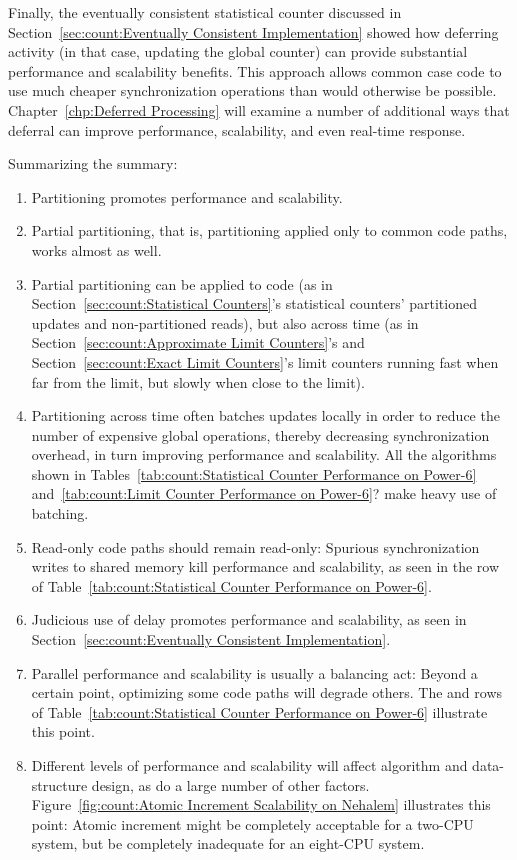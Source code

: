 Finally, the eventually consistent statistical counter discussed in
Section~\ref{sec:count:Eventually Consistent Implementation}
showed how deferring activity (in that case, updating the global
counter) can provide substantial performance and scalability benefits.
This approach allows common case code to use much cheaper synchronization
operations than would otherwise be possible.
Chapter~\ref{chp:Deferred Processing} will examine a number of additional
ways that deferral can improve performance, scalability, and even
real-time response.

Summarizing the summary:

\begin{enumerate}
\item	Partitioning promotes performance and scalability.
\item	Partial partitioning, that is, partitioning applied only to
	common code paths, works almost as well.
\item	Partial partitioning can be applied to code (as in
	Section~\ref{sec:count:Statistical Counters}'s statistical
	counters' partitioned updates and non-partitioned reads), but also
	across time (as in
	Section~\ref{sec:count:Approximate Limit Counters}'s and
	Section~\ref{sec:count:Exact Limit Counters}'s
	limit counters running fast when far from
	the limit, but slowly when close to the limit).
\item	Partitioning across time often batches updates locally
	in order to reduce the number of expensive global operations,
	thereby decreasing synchronization overhead, in turn
	improving performance and scalability.
	All the algorithms shown in
	Tables~\ref{tab:count:Statistical Counter Performance on Power-6}
	and~\ref{tab:count:Limit Counter Performance on Power-6}?
	make heavy use of batching.
\item	Read-only code paths should remain read-only:  Spurious
	synchronization writes to shared memory kill performance
	and scalability, as seen in the  row of
	Table~\ref{tab:count:Statistical Counter Performance on Power-6}.
\item	Judicious use of delay promotes performance and scalability, as
	seen in Section~\ref{sec:count:Eventually Consistent Implementation}.
\item	Parallel performance and scalability is usually a balancing act:
	Beyond a certain point, optimizing some code paths will degrade
	others.
	The  and  rows of
	Table~\ref{tab:count:Statistical Counter Performance on Power-6}
	illustrate this point.
\item	Different levels of performance and scalability will affect
	algorithm and data-structure design, as do a large number of
	other factors.
	Figure~\ref{fig:count:Atomic Increment Scalability on Nehalem}
	illustrates this point:  Atomic increment might be completely
	acceptable for a two-CPU system, but be completely inadequate for an
	eight-CPU system.
\end{enumerate}

